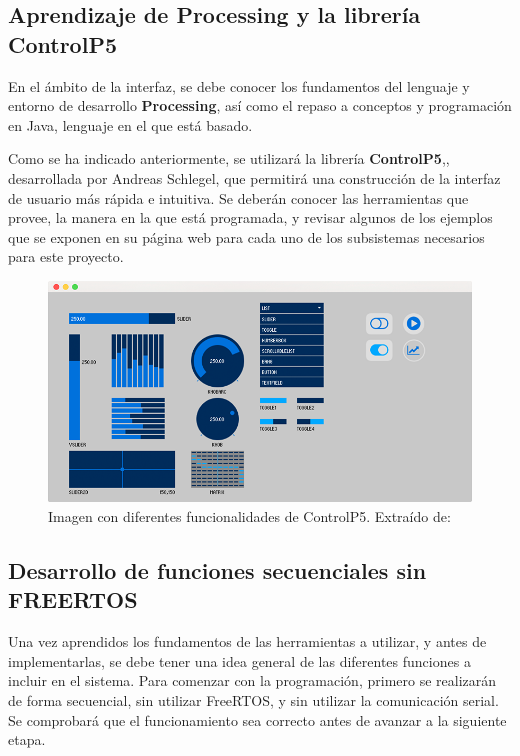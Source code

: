 \subsection{Aprendizaje de Processing y la librería ControlP5}

En el ámbito de la interfaz, se debe conocer los fundamentos del lenguaje y entorno de desarrollo \textbf{Processing}, así como el repaso a conceptos y programación en Java, lenguaje en el que está basado. \cite{processing}

Como se ha indicado anteriormente, se utilizará la librería \textbf{ControlP5},\cite{controlP5}, desarrollada por Andreas Schlegel, que permitirá una construcción de la interfaz de usuario más rápida e intuitiva. Se deberán conocer las herramientas que provee, la manera en la que está programada, y revisar algunos de los ejemplos que se exponen en su página web \cite{cp5_examples} para cada uno de los subsistemas necesarios para este proyecto.

\begin{figure}[h]
    \centering
    \includegraphics[width=1\textwidth]{imagenes/cp5_examples.png}
    \caption{Imagen con diferentes funcionalidades de ControlP5. Extraído de: \cite{cp5_image}}
\end{figure}

\subsection{Desarrollo de funciones secuenciales sin FREERTOS }

Una vez aprendidos los fundamentos de las herramientas a utilizar, y antes de implementarlas, se debe tener una idea general de las diferentes funciones a incluir en el sistema. Para comenzar con la programación, primero se realizarán de forma secuencial, sin utilizar FreeRTOS, y sin utilizar la comunicación serial. Se comprobará que el funcionamiento sea correcto antes de avanzar a la siguiente etapa. 

